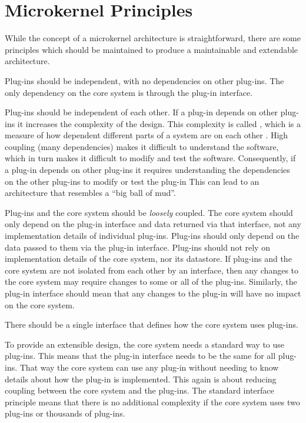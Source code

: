 \section{Microkernel Principles}
While the concept of a microkernel architecture is straightforward,
there are some principles which should be maintained to produce a maintainable and extendable architecture.

\begin{definition}
    Plug-ins should be independent, with no dependencies on other plug-ins.
    The only dependency on the core system is through the plug-in interface.
\end{definition}

Plug-ins should be independent of each other.
If a plug-in depends on other plug-ins it increases the complexity of the design.
This complexity is called ,
which is a measure of how dependent different parts of a system are on each other \cite{glossary-architecture}.
High coupling (many dependencies) makes it difficult to understand the software,
which in turn makes it difficult to modify and test the software.
Consequently, if a plug-in depends on other plug-ins it requires understanding the dependencies on the other plug-ins to modify or test the plug-in
This can lead to an architecture that resembles a ``big ball of mud''.

Plug-ins and the core system should be \emph{loosely} coupled.
The core system should only depend on the plug-in interface and data returned via that interface, not any implementation details of individual plug-ins.
Plug-ins should only depend on the data passed to them via the plug-in interface.
Plug-ins should not rely on implementation details of the core system, nor its datastore.
If plug-ins and the core system are not isolated from each other by an interface,
then any changes to the core system may require changes to some or all of the plug-ins.
Similarly, the plug-in interface should mean that any changes to the plug-in will have no impact on the core system.

\begin{definition}
    There should be a single interface that defines how the core system uses plug-ins.
\end{definition}

To provide an extensible design, the core system needs a standard way to use plug-ins.
This means that the plug-in interface needs to be the same for all plug-ins.
That way the core system can use any plug-in without needing to know details about how the plug-in is implemented.
This again is about reducing coupling between the core system and the plug-ins.
The standard interface principle means that there is no additional complexity if the core system uses two plug-ins or thousands of plug-ins.


